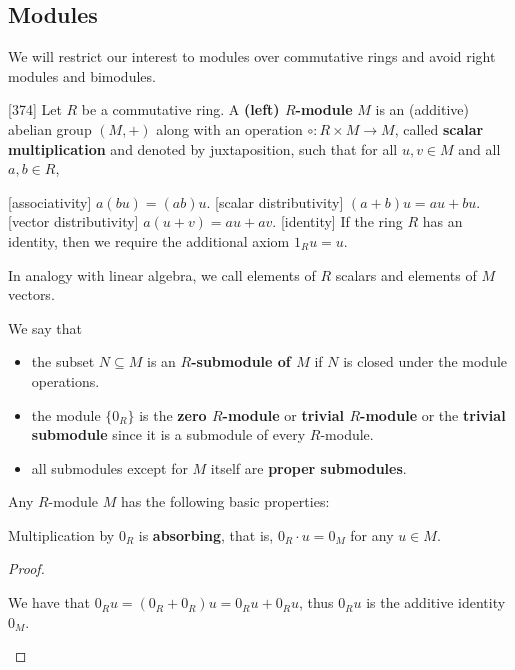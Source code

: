 \subsection{Modules}\label{subsec:modules}

\begin{remark}\label{remark:module_over_commutative_ring}
  We will restrict our interest to modules over commutative rings and avoid right modules and bimodules.
\end{remark}

\begin{definition}\label{def:module}\cite{Knapp2016BAlg}[374]
  Let \( R \) be a commutative ring. A \textbf{(left) \( R \)-module} \( M \) is an (additive) abelian group \( (M, +) \) along with an operation \( \circ: R \times M \to M \), called \textbf{scalar multiplication} and denoted by juxtaposition, such that for all \( u, v \in M \) and all \( a, b \in R \),
  \begin{description}
    [associativity] \( a (b u) = (a b) u \).
    [scalar distributivity] \( (a + b) u = a u + b u \).
    [vector distributivity] \( a (u + v) = a u + a v \).
    [identity] If the ring \( R \) has an identity, then we require the additional axiom \( 1_R u = u \).
  \end{description}

  In analogy with linear algebra, we call elements of \( R \) scalars and elements of \( M \) vectors.

  We say that
  \begin{itemize}
    \item the subset \( N \subseteq M \) is an \textbf{\( R \)-submodule of \( M \)} if \( N \) is closed under the module operations.
    \item the module \( \{ 0_R \} \) is the \textbf{zero \( R \)-module} or \textbf{trivial \( R \)-module} or the \textbf{trivial submodule} since it is a submodule of every \( R \)-module.
    \item all submodules except for \( M \) itself are \textbf{proper submodules}.
  \end{itemize}
\end{definition}

\begin{proposition}\label{def:module_properties}
  Any \( R \)-module \( M \) has the following basic properties:
  \begin{defenum}
     Multiplication by \( 0_R \) is \textbf{absorbing}, that is, \( 0_R \cdot u = 0_M \) for any \( u \in M \).
  \end{defenum}
\end{proposition}
\begin{proof}\mbox{}
  \begin{itemize}
     We have that \( 0_R u = (0_R + 0_R)u = 0_R u + 0_R u \), thus \( 0_R u \) is the additive identity \( 0_M \).
  \end{itemize}
\end{proof}

